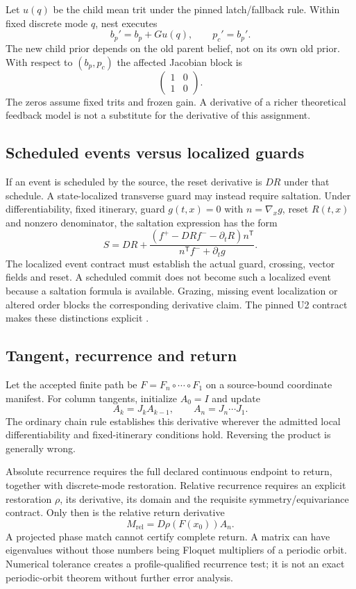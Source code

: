 \documentclass[11pt]{article}
\theoremstyle{remark}
\begin{document}
Let $u(q)$ be the child mean trit under the pinned latch/fallback rule.
Within fixed discrete mode $q$, nest executes
\[
 b_p'=b_p+G u(q),\qquad p_c'=b_p'.
\]
The new child prior depends on the old parent belief, not on its own old
prior. With respect to $(b_p,p_c)$ the affected Jacobian block is
\[
 \begin{pmatrix}1&0\\1&0\end{pmatrix}.
\]
The zeros assume fixed trits and frozen gain. A derivative of a richer
theoretical feedback model is not a substitute for the derivative of this
assignment.

\subsection{Scheduled events versus localized guards}

If an event is scheduled by the source, the reset derivative is $DR$ under
that schedule. A state-localized transverse guard may instead require
saltation. Under differentiability, fixed itinerary, guard
$g(t,x)=0$ with $n=\nabla_xg$, reset $R(t,x)$ and nonzero denominator,
the saltation expression has the form
\[
 S=DR+
 \frac{(f^+-DRf^- -\partial_tR)n^{\mathsf T}}
 {n^{\mathsf T}f^-+\partial_tg}.
\]
The localized event contract must establish the actual guard, crossing,
vector fields and reset. A scheduled commit does not become such a
localized event because a saltation formula is available. Grazing, missing
event localization or altered order blocks the corresponding derivative
claim. The pinned U2 contract makes these distinctions explicit
\cite{ellis-bidi}.

\subsection{Tangent, recurrence and return}

Let the accepted finite path be
$F=F_n\circ\cdots\circ F_1$ on a source-bound coordinate manifest.
For column tangents, initialize $A_0=I$ and update
\[
 A_k=J_k A_{k-1},\qquad A_n=J_n\cdots J_1.
\]
The ordinary chain rule establishes this derivative wherever the admitted
local differentiability and fixed-itinerary conditions hold. Reversing the
product is generally wrong.

Absolute recurrence requires the full declared continuous endpoint to
return, together with discrete-mode restoration. Relative recurrence
requires an explicit restoration $\rho$, its derivative, its domain and
the requisite symmetry/equivariance contract. Only then is the relative
return derivative
\[
 M_{\mathrm{rel}}=D\rho(F(x_0))A_n.
\]
A projected phase match cannot certify complete return. A matrix can have
eigenvalues without those numbers being Floquet multipliers of a periodic
orbit. Numerical tolerance creates a profile-qualified recurrence test;
it is not an exact periodic-orbit theorem without further error analysis.
\end{document}
